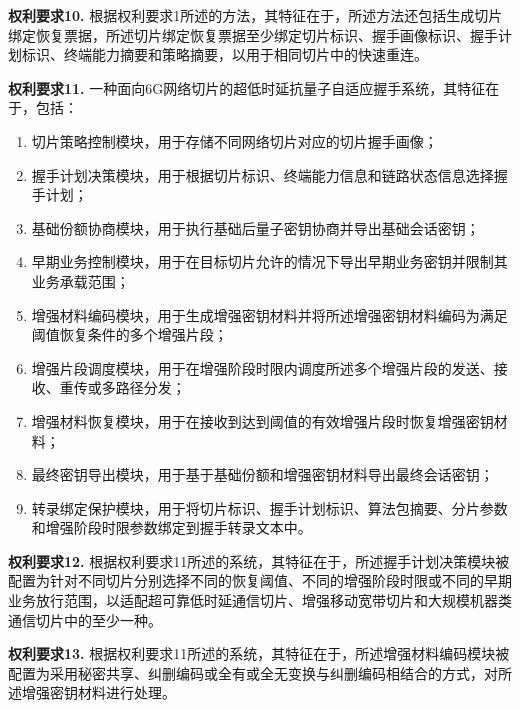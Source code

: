 \documentclass[12pt,a4paper]{article}
\begin{document}
\vspace{0.5cm}

\textbf{权利要求10.} 根据权利要求1所述的方法，其特征在于，所述方法还包括生成切片绑定恢复票据，所述切片绑定恢复票据至少绑定切片标识、握手画像标识、握手计划标识、终端能力摘要和策略摘要，以用于相同切片中的快速重连。

\vspace{0.5cm}

\textbf{权利要求11.} 一种面向6G网络切片的超低时延抗量子自适应握手系统，其特征在于，包括：

\begin{enumerate}[label=\alph*), leftmargin=2em]
    \item 切片策略控制模块，用于存储不同网络切片对应的切片握手画像；
    \item 握手计划决策模块，用于根据切片标识、终端能力信息和链路状态信息选择握手计划；
    \item 基础份额协商模块，用于执行基础后量子密钥协商并导出基础会话密钥；
    \item 早期业务控制模块，用于在目标切片允许的情况下导出早期业务密钥并限制其业务承载范围；
    \item 增强材料编码模块，用于生成增强密钥材料并将所述增强密钥材料编码为满足阈值恢复条件的多个增强片段；
    \item 增强片段调度模块，用于在增强阶段时限内调度所述多个增强片段的发送、接收、重传或多路径分发；
    \item 增强材料恢复模块，用于在接收到达到阈值的有效增强片段时恢复增强密钥材料；
    \item 最终密钥导出模块，用于基于基础份额和增强密钥材料导出最终会话密钥；
    \item 转录绑定保护模块，用于将切片标识、握手计划标识、算法包摘要、分片参数和增强阶段时限参数绑定到握手转录文本中。
\end{enumerate}

\vspace{0.5cm}

\textbf{权利要求12.} 根据权利要求11所述的系统，其特征在于，所述握手计划决策模块被配置为针对不同切片分别选择不同的恢复阈值、不同的增强阶段时限或不同的早期业务放行范围，以适配超可靠低时延通信切片、增强移动宽带切片和大规模机器类通信切片中的至少一种。

\vspace{0.5cm}

\textbf{权利要求13.} 根据权利要求11所述的系统，其特征在于，所述增强材料编码模块被配置为采用秘密共享、纠删编码或全有或全无变换与纠删编码相结合的方式，对所述增强密钥材料进行处理。
\end{document}
